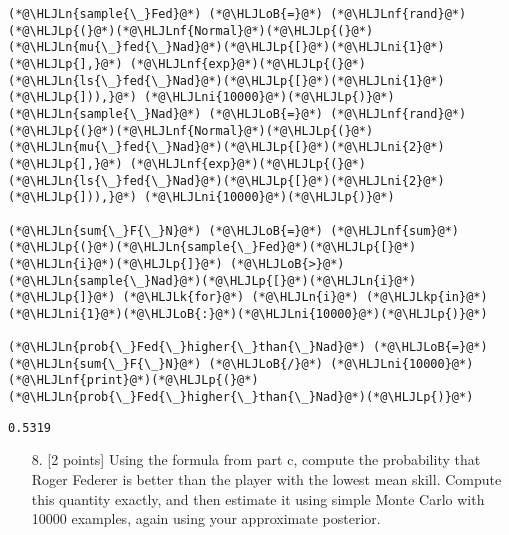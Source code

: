 \documentclass[12pt,a4paper]{article}
\newcommand{\HLJLk}[1]{\textcolor[RGB]{148,91,176}{\textbf{#1}}}
\newcommand{\HLJLkp}[1]{\textcolor[RGB]{148,91,176}{\textbf{#1}}}
\newcommand{\HLJLn}[1]{#1}
\newcommand{\HLJLnf}[1]{\textcolor[RGB]{66,102,213}{#1}}
\newcommand{\HLJLni}[1]{\textcolor[RGB]{59,151,46}{#1}}
\newcommand{\HLJLoB}[1]{\textcolor[RGB]{102,102,102}{\textbf{#1}}}
\newcommand{\HLJLp}[1]{#1}
\begin{document}
\begin{lstlisting}
(*@\HLJLn{sample{\_}Fed}@*) (*@\HLJLoB{=}@*) (*@\HLJLnf{rand}@*)(*@\HLJLp{(}@*)(*@\HLJLnf{Normal}@*)(*@\HLJLp{(}@*)(*@\HLJLn{mu{\_}fed{\_}Nad}@*)(*@\HLJLp{[}@*)(*@\HLJLni{1}@*)(*@\HLJLp{],}@*) (*@\HLJLnf{exp}@*)(*@\HLJLp{(}@*)(*@\HLJLn{ls{\_}fed{\_}Nad}@*)(*@\HLJLp{[}@*)(*@\HLJLni{1}@*)(*@\HLJLp{])),}@*) (*@\HLJLni{10000}@*)(*@\HLJLp{)}@*)
(*@\HLJLn{sample{\_}Nad}@*) (*@\HLJLoB{=}@*) (*@\HLJLnf{rand}@*)(*@\HLJLp{(}@*)(*@\HLJLnf{Normal}@*)(*@\HLJLp{(}@*)(*@\HLJLn{mu{\_}fed{\_}Nad}@*)(*@\HLJLp{[}@*)(*@\HLJLni{2}@*)(*@\HLJLp{],}@*) (*@\HLJLnf{exp}@*)(*@\HLJLp{(}@*)(*@\HLJLn{ls{\_}fed{\_}Nad}@*)(*@\HLJLp{[}@*)(*@\HLJLni{2}@*)(*@\HLJLp{])),}@*) (*@\HLJLni{10000}@*)(*@\HLJLp{)}@*)

(*@\HLJLn{sum{\_}F{\_}N}@*) (*@\HLJLoB{=}@*) (*@\HLJLnf{sum}@*)(*@\HLJLp{(}@*)(*@\HLJLn{sample{\_}Fed}@*)(*@\HLJLp{[}@*)(*@\HLJLn{i}@*)(*@\HLJLp{]}@*) (*@\HLJLoB{>}@*) (*@\HLJLn{sample{\_}Nad}@*)(*@\HLJLp{[}@*)(*@\HLJLn{i}@*)(*@\HLJLp{]}@*) (*@\HLJLk{for}@*) (*@\HLJLn{i}@*) (*@\HLJLkp{in}@*) (*@\HLJLni{1}@*)(*@\HLJLoB{:}@*)(*@\HLJLni{10000}@*)(*@\HLJLp{)}@*)

(*@\HLJLn{prob{\_}Fed{\_}higher{\_}than{\_}Nad}@*) (*@\HLJLoB{=}@*) (*@\HLJLn{sum{\_}F{\_}N}@*) (*@\HLJLoB{/}@*) (*@\HLJLni{10000}@*)
(*@\HLJLnf{print}@*)(*@\HLJLp{(}@*)(*@\HLJLn{prob{\_}Fed{\_}higher{\_}than{\_}Nad}@*)(*@\HLJLp{)}@*)
\end{lstlisting}

\begin{lstlisting}
0.5319
\end{lstlisting}


\begin{itemize}
\item[8. ] [2 points] Using the formula from part c, compute the probability that Roger Federer is better than the player with the lowest mean skill. Compute this quantity exactly, and then estimate it using simple Monte Carlo with 10000 examples, again using your approximate posterior.

\end{itemize}
\end{document}
